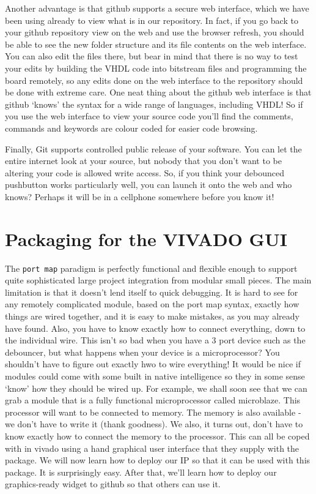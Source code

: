\documentclass[../physical_computing.tex]{subfiles}
\begin{document}
Another advantage is that github supports a secure web interface, which we have been using already to view what is in our repository. In fact, if you go back to your github repository view on the web and use the browser refresh, you should be able to see the new folder structure and its file contents on the web interface. You can also edit the files there, but bear in mind that there is no way to test your edits by building the VHDL code into bitstream files and programming the board remotely, so any edits done on the web interface to the repository should be done with extreme care. One neat thing about the github web interface is that github `knows' the syntax for a wide range of languages, including VHDL! So if you use the web interface to view your source code you'll find the comments, commands and keywords are colour coded for easier code browsing. 

Finally, Git supports controlled public release of your software. You can let the entire internet look at your source, but nobody that you don't want to be altering your code is allowed write access. So, if you think your debounced pushbutton works particularly well, you can launch it onto the web and who knows? Perhaps it will be in a cellphone somewhere before you know it!

\section{Packaging for the VIVADO GUI}
\label{sec:vivadogui}

The \texttt{port map} paradigm is perfectly functional and flexible enough to support quite sophisticated large project integration from modular small pieces. The main limitation is that it doesn't lend itself to quick debugging. It is hard to see for any remotely complicated module, based on the port map syntax, exactly how things are wired together, and it is easy to make mistakes, as you may already have found. Also, you have to know exactly how to connect everything, down to the individual wire. This isn't so bad when you have a 3 port device such as the debouncer, but what happens when your device is a microprocessor? You shouldn't have to figure out exactly hwo to wire everything! It would be nice if modules could come with some built in native intelligence so they in some sense `know' how they should be wired up. For example, we shall soon see that we can grab a module that is a fully functional microprocessor called microblaze. This processor will want to be connected to memory. The memory is also available - we don't have to write it (thank goodness). We also, it turns out, don't have to know exactly how to connect the memory to the processor. This can all be coped with in vivado using a hand graphical user interface that they supply with the package. We will now learn how to deploy our IP so that it can be used with this package. It is surprisingly easy. After that, we'll learn how to deploy our graphics-ready widget to github so that others can use it.
\end{document}
